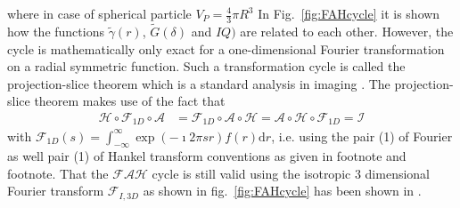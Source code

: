 where in case of spherical particle $V_P=\frac43 \pi R^3$
In Fig.\ \ref{fig:FAHcycle} it is shown how the functions $\tilde{\gamma}(r)$, $\tilde{G}(\delta)$ and $IQ)$ are related to each other. However, the cycle is mathematically only exact for a one-dimensional Fourier transformation on a radial symmetric function. Such a transformation cycle is called the projection-slice theorem which is a standard analysis in imaging \cite{Bracewell2003, Bracewell1956}. The projection-slice theorem makes use of the fact that
\begin{align}
\mathcal{H}\circ \mathcal{F}_{1D}\circ \mathcal{A} &
              =\mathcal{F}_{1D} \circ \mathcal{A}\circ \mathcal{H}
              =\mathcal{A}\circ \mathcal{H}\circ \mathcal{F}_{1D}=\mathcal{I}
\end{align}
with $\mathcal{F}_{1D}(s)=\int_{-\infty}^{\infty} \exp\left(-\imath 2\pi s r\right) f(r) \mathrm{d}r$, i.e. using the pair (1) of Fourier as well pair (1) of Hankel transform conventions as given in footnote and footnote.
That the $\mathcal{FAH}$ cycle is still valid using the isotropic 3 dimensional Fourier transform $\mathcal{F}_{I,3D}$ as shown in fig.\ \ref{fig:FAHcycle} has been shown in \cite{Kohlbrecher2017}.

